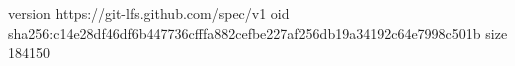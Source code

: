 version https://git-lfs.github.com/spec/v1
oid sha256:c14e28df46df6b447736cfffa882cefbe227af256db19a34192c64e7998c501b
size 184150
